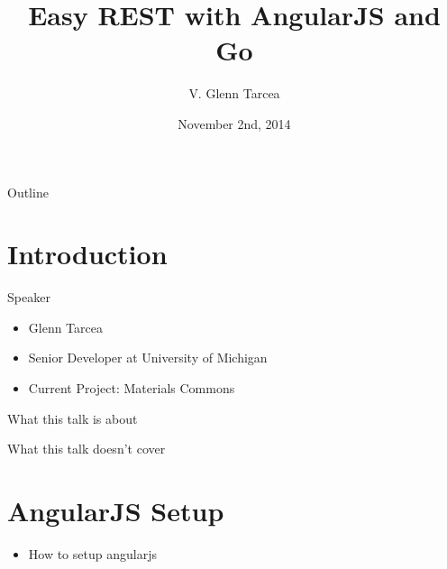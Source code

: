 \documentclass[presentation]{beamer}
\author{V. Glenn Tarcea}
\date{November 2nd, 2014}
\title{Easy REST with AngularJS and Go}
\begin{document}
\maketitle
\begin{frame}{Outline}
\tableofcontents
\end{frame}


\section{Introduction}
\label{sec-1}

\begin{frame}[label=sec-1-1]{Speaker}
\begin{itemize}
\item Glenn Tarcea
\item Senior Developer at University of Michigan
\item Current Project: Materials Commons
\end{itemize}
\end{frame}

\begin{frame}[label=sec-1-2]{What this talk is about}
\end{frame}

\begin{frame}[label=sec-1-3]{What this talk doesn't cover}
\end{frame}

\section{AngularJS Setup}
\label{sec-2}
\begin{itemize}
\item How to setup angularjs
\end{itemize}
\end{document}
